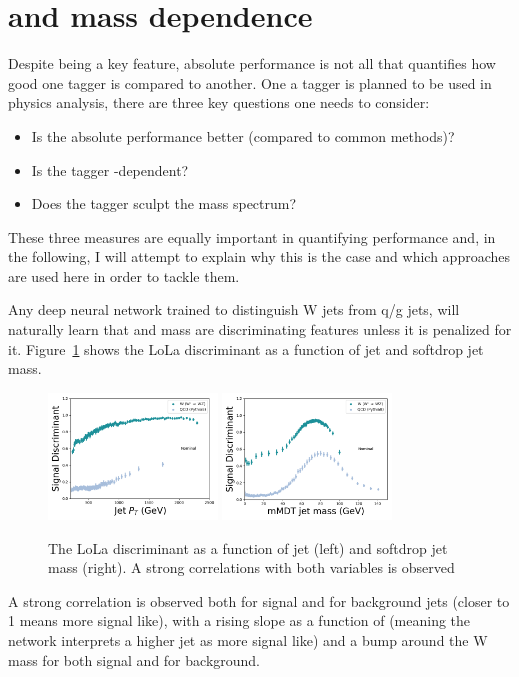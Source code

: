 \section{\PT and mass dependence}
Despite being a key feature, absolute performance is not all that quantifies how good one tagger is compared to another. One a tagger is planned to be used in physics analysis, there are three key questions one needs to consider:
\begin{itemize}
    \itemsep0em 
    \item Is the absolute performance better (compared to common methods)?
    \item Is the tagger \PT-dependent?
    \item Does the tagger sculpt the mass spectrum?
\end{itemize}
These three measures are equally important in quantifying performance and, in the following, I will attempt to explain why this is the case and which approaches are used here in order to tackle them.\par


Any deep neural network trained to distinguish W jets from q/g jets, will naturally learn that \PT and mass are discriminating features unless it is penalized for it. Figure~\ref{fig:lola:corr} shows the LoLa discriminant as a function of jet \PT and softdrop jet mass. 
\begin{figure}[h!]
\centering
\includegraphics[width=0.4\textwidth]{figures/vtagging/lola/wLola_v6_500rew-profile-jpt.png}
\includegraphics[width=0.4\textwidth]{figures/vtagging/lola/wLola_v6_500rew-profile-jsd0.png}
\caption{The LoLa discriminant as a function of jet \PT (left) and softdrop jet mass (right). A strong correlations with both variables is observed}
\label{fig:lola:corr}
\end{figure}
A strong correlation is observed both for signal and for background jets (closer to 1 means more signal like), with a rising slope as a function of \PT (meaning the network interprets a higher jet \PT as more signal like) and a bump around the W mass for both signal and for background.

